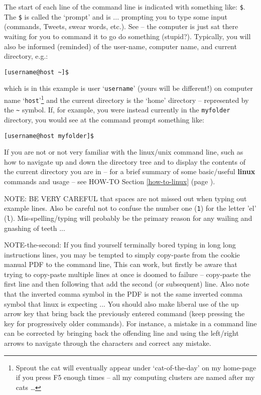 The start of each line of the command line is indicated with something like: \texttt{\$}. The \texttt{\$} is called the ‘prompt’ and is ... prompting you to type some input (commands, Tweets, swear words, etc.). See – the computer is just sat there waiting for you to command it to go do something (stupid?). Typically, you will also be informed (reminded) of the user-name, computer name, and current directory, e.g.:

\vspace{-2mm}
\begin{verbatim}
[username@host ~]$
\end{verbatim}
\vspace{-2mm}

\noindent which is in this example is user ‘\texttt{username}’ (yours will be different!) on computer name ‘\texttt{host}’\footnote{Sprout the cat will eventually appear under ‘cat-of-the-day’ on my home-page if you press \textsf{F5} enough times – all my computing clusters are named after my cats …} and the current directory is the ‘home’ directory -- represented by the \texttt{\~} symbol. If, for example, you were instead currently in the \texttt{myfolder} directory, you would see at the command prompt something like:

\vspace{-2mm}
\begin{verbatim}
[username@host myfolder]$
\end{verbatim}
\vspace{-2mm}

If you are not or not very familiar with the linux/unix command line, such as how to navigate up and down the directory tree and to display the contents of the current directory you are in – for a brief summary of some basic/useful \textbf{linux} commands and usage -- see HOW-TO Section \ref{how-to-linux} (page \pageref{how-to-linux}).

NOTE: BE VERY CAREFUL that spaces are not missed out when typing out example lines. Also be careful not to confuse the number one (\texttt{1}) for the letter 'el' (\texttt{l}). Mis-spelling/typing will probably be the primary reason for any wailing and gnashing of teeth ...

NOTE-the-second: If you find yourself terminally bored typing in long long instructions lines, you may be tempted to simply copy-paste from the cookie manual PDF to the command line, This can work, but firstly be aware that trying to copy-paste multiple lines at once is doomed to failure -- copy-paste the first line and then following that add the second (or subsequent) line.
Also note that the inverted comma symbol in the PDF is not the same inverted comma symbol that linux is expecting ... You should also make liberal use of the up arrow key that bring back the previously entered command (keep pressing the key for progressively older commands). For instance, a mistake in a command line can be corrected by bringing back the offending line and using the left/right arrows to navigate through the characters and correct any mistake.


